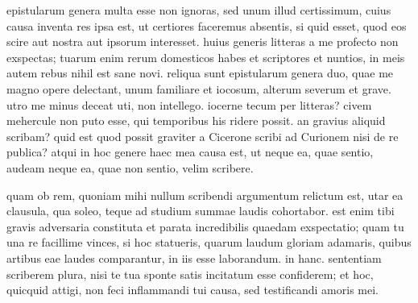 


 epistularum genera multa esse non ignoras, sed unum illud certissimum, cuius causa inventa res ipsa est, ut certiores faceremus absentis, si quid esset, quod eos scire aut nostra aut ipsorum interesset. huius generis litteras a me profecto non exspectas; tuarum enim rerum domesticos habes et scriptores et nuntios, in meis autem rebus nihil est sane novi. reliqua sunt epistularum genera duo, quae me magno opere delectant, unum familiare et iocosum, alterum severum et grave. utro me minus deceat uti, non intellego. iocerne tecum per litteras? civem mehercule non puto esse, qui temporibus his ridere possit. an gravius aliquid scribam? quid est quod possit graviter a Cicerone scribi ad Curionem nisi de re publica? atqui in hoc genere haec mea causa est, ut neque ea, quae sentio, audeam neque ea, quae non sentio, velim scribere.

 quam ob rem, quoniam mihi nullum scribendi argumentum relictum est, utar ea clausula, qua soleo, teque ad studium summae laudis cohortabor. est enim tibi gravis adversaria constituta et parata incredibilis quaedam exspectatio; quam tu una re facillime vinces, si hoc statueris, quarum laudum gloriam adamaris, quibus artibus eae laudes comparantur, in iis esse laborandum. in hanc. sententiam scriberem plura, nisi te tua sponte satis incitatum esse confiderem; et hoc, quicquid attigi, non feci inflammandi tui causa, sed testificandi amoris mei.

